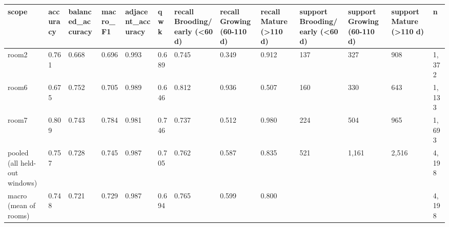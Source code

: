 \begin{tabular}{lllllllllllll}
\hline
scope & accuracy & balanced\_accuracy & macro\_F1 & adjacent\_accuracy & qwk & recall Brooding/early (<60 d) & recall Growing (60-110 d) & recall Mature (>110 d) & support Brooding/early (<60 d) & support Growing (60-110 d) & support Mature (>110 d) & n \\
\hline
room2 & 0.761 & 0.668 & 0.696 & 0.993 & 0.689 & 0.745 & 0.349 & 0.912 & 137 & 327 & 908 & 1,372 \\
room6 & 0.675 & 0.752 & 0.705 & 0.989 & 0.646 & 0.812 & 0.936 & 0.507 & 160 & 330 & 643 & 1,133 \\
room7 & 0.809 & 0.743 & 0.784 & 0.981 & 0.746 & 0.737 & 0.512 & 0.980 & 224 & 504 & 965 & 1,693 \\
pooled (all held-out windows) & 0.757 & 0.728 & 0.745 & 0.987 & 0.705 & 0.762 & 0.587 & 0.835 & 521 & 1,161 & 2,516 & 4,198 \\
macro (mean of rooms) & 0.748 & 0.721 & 0.729 & 0.987 & 0.694 & 0.765 & 0.599 & 0.800 &  &  &  & 4,198 \\
\hline
\end{tabular}
